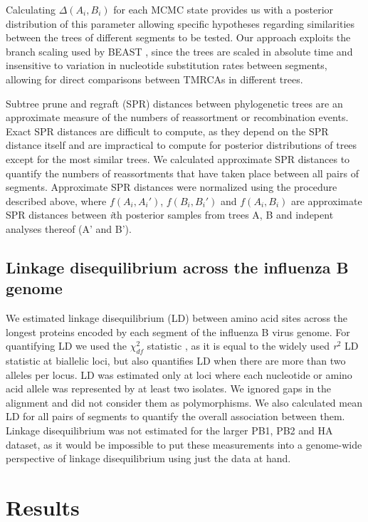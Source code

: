 \documentclass[11pt,oneside,letterpaper]{article}
\begin{document}
Calculating $\Delta(A_i, B_i)$ for each MCMC state provides us with a posterior distribution of this parameter allowing  specific hypotheses regarding similarities between the trees of different segments to be tested.
Our approach exploits the branch scaling used by BEAST \cite{drummond2012}, since the trees are scaled in absolute time and insensitive to variation in nucleotide substitution rates between segments, allowing for direct comparisons between TMRCAs in different trees.

Subtree prune and regraft (SPR) distances between phylogenetic trees are an approximate measure of the numbers of reassortment or recombination events.
Exact SPR distances are difficult to compute, as they depend on the SPR distance itself and are impractical to compute for posterior distributions of trees except for the most similar trees.
We calculated approximate SPR distances \cite{whidden2009,whidden2010,whidden2013} to quantify the numbers of reassortments that have taken place between all pairs of segments.
Approximate SPR distances were normalized using the procedure described above, where $f(A_i, A_i')$, $f(B_i, B_i')$ and $f(A_i, B_i)$ are approximate SPR distances between \textit{i}th posterior samples from trees A, B and indepent analyses thereof (A' and B').

\subsection*{Linkage disequilibrium across the influenza B genome}
We estimated linkage disequilibrium (LD) between amino acid sites across the longest proteins encoded by each segment of the influenza B virus genome.
For quantifying LD we used the $\chi^{2}_{df}$ statistic \cite{zhao2005}, as it is equal to the widely used \textit{r$^{2}$} LD statistic at biallelic loci, but also quantifies LD when there are more than two alleles per locus.
LD was estimated only at loci where each nucleotide or amino acid allele was represented by at least two isolates.
We ignored gaps in the alignment and did not consider them as polymorphisms.
We also calculated mean LD for all pairs of segments to quantify the overall association between them.
Linkage disequilibrium was not estimated for the larger PB1, PB2 and HA dataset, as it would be impossible to put these measurements into a genome-wide perspective of linkage disequilibrium using just the data at hand.

\section*{Results}
\end{document}
